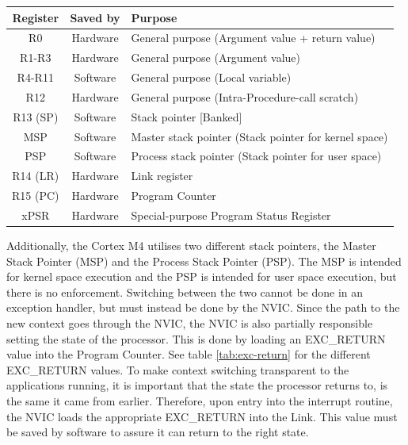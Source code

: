 \begin{table}[H]
	\centering
	\begin{tabular}{|c|c|p{9.5cm}|}
		\hline
		Register	&	Saved by	&	Purpose\\
		\hline
		R0			&	Hardware	&	General purpose (Argument value + return value)\\
		\hline
		R1-R3		&	Hardware	&	General purpose (Argument value)\\
		\hline
		R4-R11		&	Software	&	General purpose (Local variable)\\
		\hline
		R12			&	Hardware	&	General purpose (Intra-Procedure-call scratch)\\
		\hline
		R13 (SP)	&	Software	&	Stack pointer [Banked]\\
		MSP			&	Software	&	Master stack pointer (Stack pointer for kernel space)\\
		PSP			&	Software	&	Process stack pointer (Stack pointer for user space)\\
		\hline
		R14 (LR)	&	Hardware	&	Link register\\
		\hline
		R15 (PC)	&	Hardware	&	Program Counter\\
		\hline
		xPSR		&	Hardware	& 	Special-purpose Program Status Register\\
		\hline
	\end{tabular}
	\label{tab:registers}
\end{table}

Additionally, the Cortex M4 utilises two different stack pointers, the Master Stack Pointer (MSP) and the Process Stack Pointer (PSP).
The MSP is intended for kernel space execution and the PSP is intended for user space execution, but there is no enforcement.
Switching between the two cannot be done in an exception handler, but must instead be done by the NVIC.
Since the path to the new context goes through the NVIC, the NVIC is also partially responsible setting the state of the processor.
This is done by loading an EXC\_RETURN value into the Program Counter. See table \ref{tab:exc-return} for the different EXC\_RETURN values.
To make context switching transparent to the applications running, it is important that the state the processor returns to, is the
same it came from earlier. Therefore, upon entry into the interrupt routine, the NVIC loads the appropriate EXC\_RETURN into the Link.
This value must be saved by software to assure it can return to the right state.

